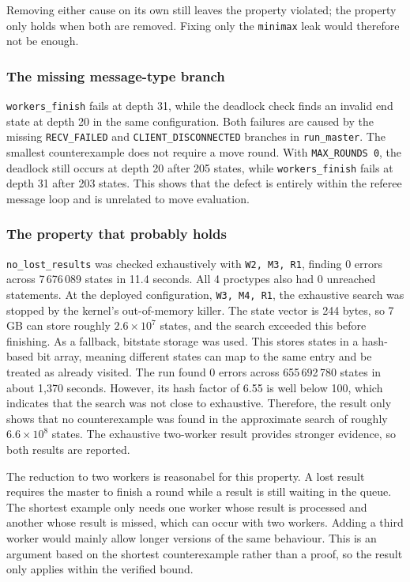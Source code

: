 \documentclass[10pt,a4paper]{article}
\newcommand{\code}[1]{\texttt{#1}}
\begin{document}
Removing either cause on its own still leaves the property violated; the
property only holds when both are removed. Fixing only the \code{minimax}
leak would therefore not be enough.
\subsubsection*{The missing message-type branch}

\code{workers\_finish} fails at depth 31, while the deadlock check finds an
invalid end state at depth 20 in the same configuration. Both failures are 
caused by the missing \code{RECV\_FAILED} and \code{CLIENT\_DISCONNECTED} 
branches in \code{run\_master}. The smallest counterexample does not require 
a move round. With \code{MAX\_ROUNDS 0}, the deadlock still occurs at depth 
20 after 205 states, while \code{workers\_finish} fails at depth 31 after 203 
states. This shows that the defect is entirely within the referee message 
loop and is unrelated to move evaluation.

\subsubsection*{The property that probably holds}

\code{no\_lost\_results} was checked exhaustively with \code{W2, M3, R1}, 
finding 0 errors across 7\,676\,089 states in 11.4 seconds. All 4 proctypes 
also had 0 unreached statements. At the deployed configuration, 
\code{W3, M4, R1}, the exhaustive search was stopped by the kernel's 
out-of-memory killer. The state vector is 244 bytes, so 7\,GB can store 
roughly $2.6 \times 10^7$ states, and the search exceeded this before 
finishing. As a fallback, bitstate storage was used. This stores states in a 
hash-based bit array, meaning different states can map to the same entry and 
be treated as already visited. The run found 0 errors across 655\,692\,780 
states in about 1,370 seconds. However, its hash factor of 6.55 is well 
below 100, which indicates that the search was not close to exhaustive. 
Therefore, the result only shows that no counterexample was found in the 
approximate search of roughly $6.6 \times 10^8$ states. The exhaustive 
two-worker result provides stronger evidence, so both results are reported.

The reduction to two workers is reasonabel for this property. A lost result 
requires the master to finish a round while a result is still waiting in the 
queue. The shortest example only needs one worker whose result is processed 
and another whose result is missed, which can occur with two workers. 
Adding a third worker would mainly allow longer versions of the same 
behaviour. This is an argument based on the shortest counterexample rather 
than a proof, so the result only applies within the verified bound.
\end{document}
